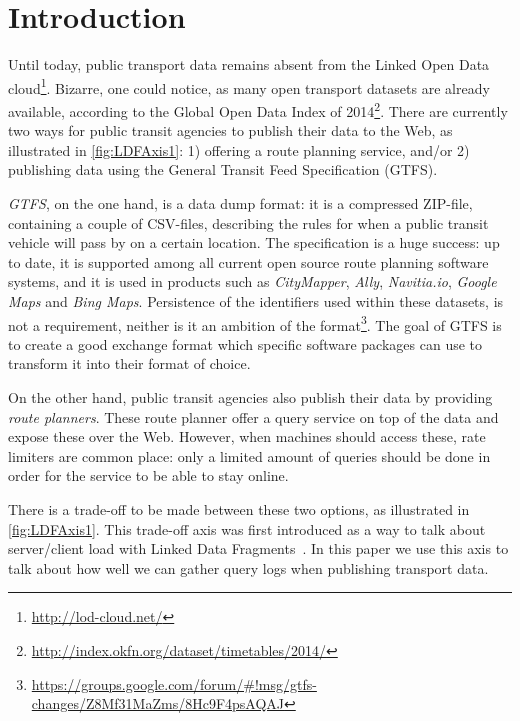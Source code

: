 \documentclass{sig-alternate}
\begin{document}
\vspace{1em}

\section{Introduction}
\label{sec:introduction}

Until today, public transport data remains absent from the Linked Open Data cloud\footnote{\url{http://lod-cloud.net/}}.
Bizarre, one could notice, as many open transport datasets are already available, according to the Global Open Data Index of 2014\footnote{\url{http://index.okfn.org/dataset/timetables/2014/}}.
There are currently two ways for public transit agencies to publish their data to the Web, as illustrated in \cref{fig:LDFAxis1}: 1) offering a route planning service, and/or 2) publishing data using the General Transit Feed Specification (GTFS).

\emph{GTFS}, on the one hand, is a data dump format: it is a compressed ZIP-file, containing a couple of CSV-files, describing the rules for when a public transit vehicle will pass by on a certain location.
The specification is a huge success: up to date, it is supported among all current open source route planning software systems, and it is used in products such as \emph{CityMapper}, \emph{Ally}, \emph{Navitia.io}, \emph{Google Maps} and \emph{Bing Maps}.
Persistence of the identifiers used within these datasets, is not a requirement, neither is it an ambition of the format\footnote{\url{https://groups.google.com/forum/#!msg/gtfs-changes/Z8Mf31MaZms/8Hc9F4psAQAJ}}.
The goal of GTFS is to create a good exchange format which specific software packages can use to transform it into their format of choice.

On the other hand, public transit agencies also publish their data by providing \emph{route planners}.
These route planner offer a query service on top of the data and expose these over the Web.
However, when machines should access these, rate limiters are common place: only a limited amount of queries should be done in order for the service to be able to stay online.

There is a trade-off to be made between these two options, as illustrated in \cref{fig:LDFAxis1}.
This trade-off axis was first introduced as a way to talk about server/client load with Linked Data Fragments~\cite{ldf}.
In this paper we use this axis to talk about how well we can gather query logs when publishing transport data.
\end{document}
